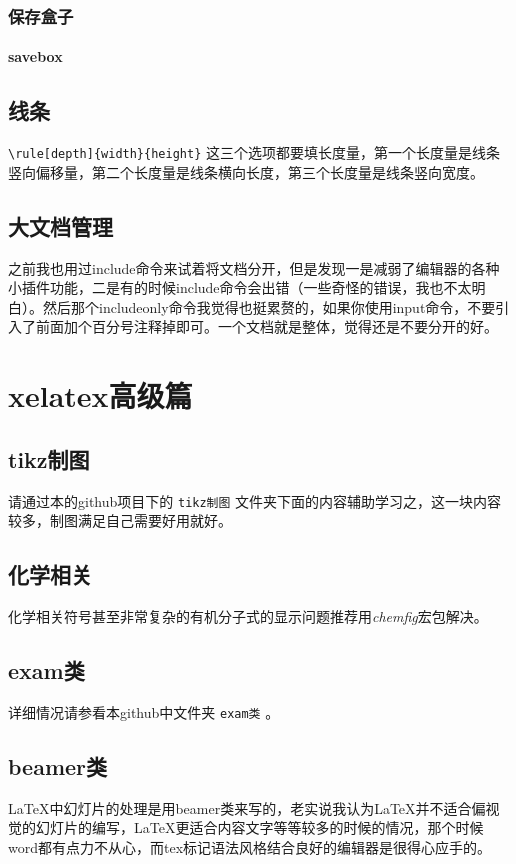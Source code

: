 \documentclass[11pt,oneside]{book}
\begin{document}
        \section{保存盒子}
        \subsection{savebox}


        \chapter{线条}
        \verb+\rule[depth]{width}{height}+
        这三个选项都要填长度量，第一个长度量是线条竖向偏移量，第二个长度量是线条横向长度，第三个长度量是线条竖向宽度。

        \chapter{大文档管理}
        之前我也用过include命令来试着将文档分开，但是发现一是减弱了编辑器的各种小插件功能，二是有的时候include命令会出错（一些奇怪的错误，我也不太明白）。然后那个includeonly命令我觉得也挺累赘的，如果你使用input命令，不要引入了前面加个百分号注释掉即可。一个文档就是整体，觉得还是不要分开的好。


        \part{xelatex高级篇}
        \chapter{tikz制图}
        请通过本的github项目下的 \verb+tikz制图+ 文件夹下面的内容辅助学习之，这一块内容较多，制图满足自己需要好用就好。

        \chapter{化学相关}
        化学相关符号甚至非常复杂的有机分子式的显示问题推荐用\emph{chemfig}宏包解决。


        \chapter{exam类}
        详细情况请参看本github中文件夹 \verb+exam类+ 。

        \chapter{beamer类}
        \LaTeX 中幻灯片的处理是用beamer类来写的，老实说我认为\LaTeX 并不适合偏视觉的幻灯片的编写，\LaTeX 更适合内容文字等等较多的时候的情况，那个时候 word都有点力不从心，而tex标记语法风格结合良好的编辑器是很得心应手的。
\end{document}
